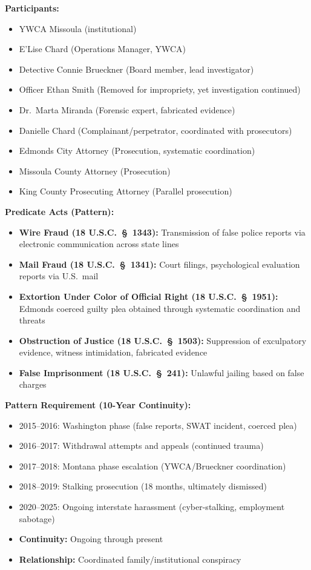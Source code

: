 \documentclass[11pt, letterpaper]{article}
\begin{document}
\textbf{Participants:}
\begin{itemize}[leftmargin=*,itemsep=2pt]
    \item YWCA Missoula (institutional)
    \item E'Lise Chard (Operations Manager, YWCA)
    \item Detective Connie Brueckner (Board member, lead investigator)
    \item Officer Ethan Smith (Removed for impropriety, yet investigation continued)
    \item Dr.\ Marta Miranda (Forensic expert, fabricated evidence)
    \item Danielle Chard (Complainant/perpetrator, coordinated with prosecutors)
    \item Edmonds City Attorney (Prosecution, systematic coordination)
    \item Missoula County Attorney (Prosecution)
    \item King County Prosecuting Attorney (Parallel prosecution)
\end{itemize}

\textbf{Predicate Acts (Pattern):}
\begin{itemize}[leftmargin=*,itemsep=2pt]
    \item \textbf{Wire Fraud (18 U.S.C.\ \S\ 1343):} Transmission of false police reports via electronic communication across state lines
    \item \textbf{Mail Fraud (18 U.S.C.\ \S\ 1341):} Court filings, psychological evaluation reports via U.S.\ mail
    \item \textbf{Extortion Under Color of Official Right (18 U.S.C.\ \S\ 1951):} Edmonds coerced guilty plea obtained through systematic coordination and threats
    \item \textbf{Obstruction of Justice (18 U.S.C.\ \S\ 1503):} Suppression of exculpatory evidence, witness intimidation, fabricated evidence
    \item \textbf{False Imprisonment (18 U.S.C.\ \S\ 241):} Unlawful jailing based on false charges
\end{itemize}

\textbf{Pattern Requirement (10-Year Continuity):}
\begin{itemize}[leftmargin=*,itemsep=2pt]
    \item 2015--2016: Washington phase (false reports, SWAT incident, coerced plea)
    \item 2016--2017: Withdrawal attempts and appeals (continued trauma)
    \item 2017--2018: Montana phase escalation (YWCA/Brueckner coordination)
    \item 2018--2019: Stalking prosecution (18 months, ultimately dismissed)
    \item 2020--2025: Ongoing interstate harassment (cyber-stalking, employment sabotage)
    \item \textbf{Continuity:} Ongoing through present
    \item \textbf{Relationship:} Coordinated family/institutional conspiracy
\end{itemize}
\end{document}

